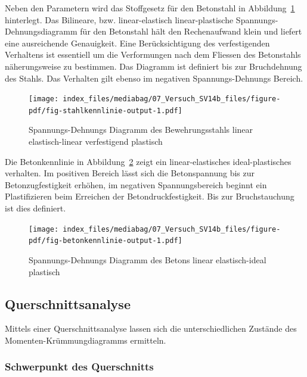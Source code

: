 \documentclass[
  letterpaper,
]{scrreprt}
\begin{document}
Neben den Parametern wird das Stoffgesetz für den Betonstahl in
Abbildung~\ref{fig-stahlkennlinie} hinterlegt. Das Bilineare, bzw.
linear-elastisch linear-plastische Spannungs-Dehnungsdiagramm für den
Betonstahl hält den Rechenaufwand klein und liefert eine ausreichende
Genauigkeit. Eine Berücksichtigung des verfestigenden Verhaltens ist
essentiell um die Verformungen nach dem Fliessen des Betonstahls
näherungsweise zu bestimmen. Das Diagramm ist definiert bis zur
Bruchdehnung des Stahls. Das Verhalten gilt ebenso im negativen
Spannungs-Dehnungs Bereich.

\begin{figure}[H]

{\centering \texttt{[image: index\_files/mediabag/07\_Versuch\_SV14b\_files/figure-pdf/fig-stahlkennlinie-output-1.pdf]}

}

\caption{\label{fig-stahlkennlinie}Spannungs-Dehnungs Diagramm des
Bewehrungsstahls linear elastisch-linear verfestigend plastisch}

\end{figure}

Die Betonkennlinie in Abbildung~\ref{fig-betonkennlinie} zeigt ein
linear-elastisches ideal-plastisches verhalten. Im positiven Bereich
lässt sich die Betonspannung bis zur Betonzugfestigkeit erhöhen, im
negativen Spannungsbereich beginnt ein Plastifizieren beim Erreichen der
Betondruckfestigkeit. Bis zur Bruchstauchung ist dies definiert.

\begin{figure}[H]

{\centering \texttt{[image: index\_files/mediabag/07\_Versuch\_SV14b\_files/figure-pdf/fig-betonkennlinie-output-1.pdf]}

}

\caption{\label{fig-betonkennlinie}Spannungs-Dehnungs Diagramm des
Betons linear elastisch-ideal plastisch}

\end{figure}

\hypertarget{querschnittsanalyse-1}{%
\subsection{Querschnittsanalyse}\label{querschnittsanalyse-1}}

Mittels einer Querschnittsanalyse lassen sich die unterschiedlichen
Zustände des Momenten-Krümmungdiagramms ermitteln.

\hypertarget{schwerpunkt-des-querschnitts-1}{%
\subsubsection{Schwerpunkt des
Querschnitts}\label{schwerpunkt-des-querschnitts-1}}
\end{document}
